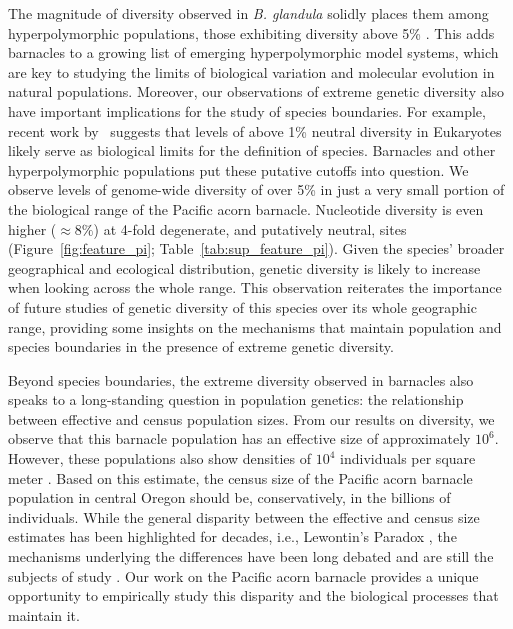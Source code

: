 \documentclass[11pt]{article}
\newcommand{\bgla}{\textit{B. glandula}\xspace}
\begin{document}
The magnitude of diversity observed in \bgla{} solidly places them among
hyperpolymorphic populations, those exhibiting diversity above 5\%
\citep{cutter_molecular_2013}. This adds barnacles to a growing list of emerging
hyperpolymorphic model systems, which are key to studying the limits of biological
variation and molecular evolution in natural populations. Moreover, our observations
of extreme genetic diversity also have important implications for the study of species
boundaries. For example, recent work by~\cite{hart_genomic_2025} suggests that levels
of above 1\% neutral diversity in Eukaryotes likely serve as biological limits for the
definition of species. Barnacles and other hyperpolymorphic populations put these
putative cutoffs into question. We observe levels of genome-wide diversity of over 5\%
in just a very small portion of the biological range of the Pacific acorn barnacle.
Nucleotide diversity is even higher ($\approx8\%$) at 4-fold degenerate, and putatively
neutral, sites (Figure~\ref{fig:feature_pi}; Table~\ref{tab:sup_feature_pi}).
Given the species' broader geographical and ecological distribution, genetic
diversity is likely to increase when looking across the whole range. This
observation reiterates the importance of future studies of genetic diversity
of this species over its whole geographic range, providing some insights on
the mechanisms that maintain population and species boundaries in the presence
of extreme genetic diversity.
\vspace{0.2cm}

Beyond species boundaries, the extreme diversity observed in barnacles also speaks to
a long-standing question in population genetics: the relationship between effective
and census population sizes. From our results on diversity, we
observe that this barnacle population has an effective size of approximately $10^{6}$.
However, these populations also show densities of $10^{4}$ individuals per square meter
\citep{menge_recruitment_2000}. Based on this estimate, the census size of the Pacific
acorn barnacle population in central Oregon should be, conservatively, in the billions of
individuals. While the general disparity between the effective and census size estimates
has been highlighted for decades, i.e., Lewontin's Paradox \citep{lewontin_genetic_1974},
the mechanisms underlying the differences have been long debated
\citep{gillespie_role_1999,gillespie_genetic_2000,smith_hitch-hiking_1974,
kimura_neutral_1983} and are still the subjects of study \citep{buffalo_quantifying_2021}.
Our work on the Pacific acorn barnacle provides a unique opportunity to empirically
study this disparity and the biological processes that maintain it.
\end{document}
